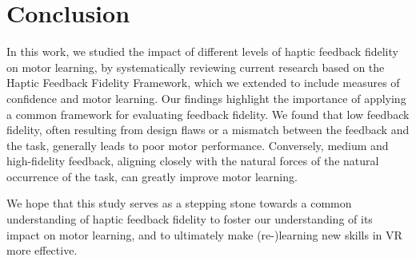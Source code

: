 \section{Conclusion}

In this work, we studied the impact of different levels of haptic feedback fidelity on motor learning, by systematically reviewing current research based on the Haptic Feedback Fidelity Framework, which we extended to include measures of confidence and motor learning. 
Our findings highlight the importance of applying a common framework for evaluating feedback fidelity. We found that low feedback fidelity, often resulting from design flaws or a mismatch between the feedback and the task, generally leads to poor motor performance. Conversely, medium and high-fidelity feedback, aligning closely with the natural forces of the natural occurrence of the task, can greatly improve motor learning. 

We hope that this study serves as a stepping stone towards a common understanding of haptic feedback fidelity to foster our understanding of its impact on motor learning, and to ultimately make (re-)learning new skills in VR more effective. 